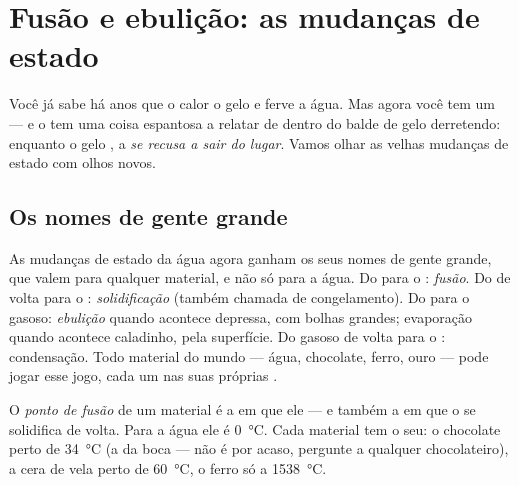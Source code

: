 \chapter{Fusão e ebulição: as mudanças de estado}\label{ch:g4:changes-of-state}

Você já sabe há anos que o calor  o gelo e ferve a água. Mas
agora você tem um  --- e o  tem uma coisa
espantosa a relatar de dentro do balde de gelo derretendo: enquanto o
gelo , a  \emph{se recusa a sair do lugar}. Vamos
olhar as velhas mudanças de estado com olhos novos.

\section{Os nomes de gente grande}

As mudanças de estado da água agora ganham os seus nomes de gente
grande, que valem para qualquer material, e não só para a água. Do
 para o : \emph{fusão}. Do  de volta
para o : \emph{solidificação} (também
chamada de congelamento). Do  para o gasoso:
\emph{ebulição} quando acontece depressa, com bolhas
grandes; evaporação quando acontece caladinho, pela superfície. Do
gasoso de volta para o : condensação. Todo material do mundo
--- água, chocolate, ferro, ouro --- pode jogar esse jogo, cada um
nas suas próprias .

\begin{definition}\label{def:g4:changes-of-state:melting-point}
O \emph{ponto de fusão} de um material é a
 em que ele  --- e também a  em que o
 se solidifica de volta. Para a água ele é \qty{0}{\celsius}.
Cada material tem o seu: o chocolate  perto de
\qty{34}{\celsius} (a  da boca --- não é por acaso,
pergunte a qualquer chocolateiro), a cera de vela perto de
\qty{60}{\celsius}, o ferro só a \qty{1538}{\celsius}.
\end{definition}

